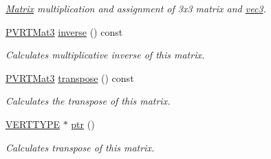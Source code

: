 \begin{DoxyCompactItemize}
\begin{DoxyCompactList}\small\item\em \hyperlink{class_matrix}{Matrix} multiplication and assignment of 3x3 matrix and \hyperlink{classvec3}{vec3}. \end{DoxyCompactList}\item 
\hyperlink{struct_p_v_r_t_mat3}{P\+V\+R\+T\+Mat3} \hyperlink{struct_p_v_r_t_mat3_a28c5953ce1de25ac39d6659fdb2b7df2}{inverse} () const 
\begin{DoxyCompactList}\small\item\em Calculates multiplicative inverse of this matrix. \end{DoxyCompactList}\item 
\hyperlink{struct_p_v_r_t_mat3}{P\+V\+R\+T\+Mat3} \hyperlink{struct_p_v_r_t_mat3_ac3c1b7afb06e37c2bad8cf31b6263c20}{transpose} () const 
\begin{DoxyCompactList}\small\item\em Calculates the transpose of this matrix. \end{DoxyCompactList}\item 
\hyperlink{group___a_p_i___o_g_l_e_s_ga06da457b7d3e93368ab904f89e1396be}{V\+E\+R\+T\+T\+Y\+P\+E} $\ast$ \hyperlink{struct_p_v_r_t_mat3_ab233b50ed2f8f39ace06ba082960c5ae}{ptr} ()
\begin{DoxyCompactList}\small\item\em Calculates transpose of this matrix. \end{DoxyCompactList}\end{DoxyCompactItemize}
